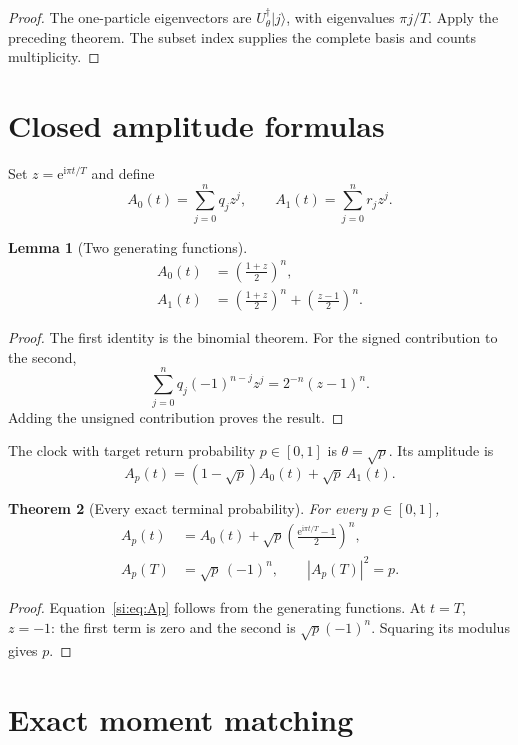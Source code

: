 \documentclass[12pt]{article}
\newtheorem{theorem}{Theorem}[section]
\newtheorem{lemma}[theorem]{Lemma}
\newcommand{\ee}{\mathrm e}
\newcommand{\ii}{\mathrm i}
\begin{document}
\begin{proof}
The one-particle eigenvectors are
\(U_\theta^\dagger|j\rangle\), with eigenvalues \(\pi j/T\). Apply the
preceding theorem. The subset index supplies the complete basis and counts
multiplicity.
\end{proof}

\section{Closed amplitude formulas}

Set \(z=\ee^{\ii\pi t/T}\) and define
\[
 A_0(t)=\sum_{j=0}^{n}q_jz^j,\qquad
 A_1(t)=\sum_{j=0}^{n}r_jz^j.
\]

\begin{lemma}[Two generating functions]
\begin{align}
 A_0(t)&=\left(\frac{1+z}{2}\right)^n,
\label{si:eq:A0}\\
 A_1(t)&=\left(\frac{1+z}{2}\right)^n+
          \left(\frac{z-1}{2}\right)^n.
\label{si:eq:A1}
\end{align}
\end{lemma}

\begin{proof}
The first identity is the binomial theorem. For the signed contribution to
the second,
\[
\sum_{j=0}^{n}q_j(-1)^{n-j}z^j
=2^{-n}(z-1)^n.
\]
Adding the unsigned contribution proves the result.
\end{proof}

The clock with target return probability \(p\in[0,1]\) is
\(\theta=\sqrt p\). Its amplitude is
\[
 A_p(t)=(1-\sqrt p)A_0(t)+\sqrt p\,A_1(t).
\]

\begin{theorem}[Every exact terminal probability]
For every \(p\in[0,1]\),
\begin{align}
 A_p(t)&=A_0(t)+\sqrt p
   \left(\frac{\ee^{\ii\pi t/T}-1}{2}\right)^n,
\label{si:eq:Ap}\\
 A_p(T)&=\sqrt p\,(-1)^n,\qquad |A_p(T)|^2=p.
\label{si:eq:target}
\end{align}
\end{theorem}

\begin{proof}
Equation~\eqref{si:eq:Ap} follows from the generating functions. At
\(t=T\), \(z=-1\): the first term is zero and the second is
\(\sqrt p(-1)^n\). Squaring its modulus gives \(p\).
\end{proof}

\section{Exact moment matching}
\end{document}
